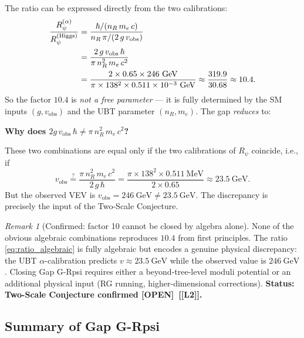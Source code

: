 \documentclass[12pt]{article}
\theoremstyle{definition}
\theoremstyle{remark}
\newtheorem{remark}[theorem]{Remark}
\newcommand{\Ltwo}{\textbf{[L2]}}
\newcommand{\OPEN}{\textbf{[OPEN]}}
\begin{document}
The ratio can be expressed directly from the two calibrations:
\begin{align}
  \frac{R_\psi^{(\alpha)}}{R_\psi^{(\text{Higgs})}}
  &= \frac{\hbar/(n_R\,m_e\,c)}{n_R\,\pi/(2\,g\,v_{\text{obs}})}
  \notag\\
  &= \frac{2\,g\,v_{\text{obs}}\,\hbar}
          {\pi\,n_R^2\,m_e\,c^2}
  \notag\\
  &= \frac{2 \times 0.65 \times 246\ \text{GeV}}
          {\pi \times 138^2 \times 0.511\times10^{-3}\ \text{GeV}}
  \approx \frac{319.9}{30.68}
  \approx 10.4.
  \label{eq:ratio_algebraic}
\end{align}
So the factor $10.4$ is \emph{not a free parameter} — it is fully
determined by the SM inputs $(g, v_{\text{obs}})$ and the UBT
parameter $(n_R, m_e)$.  The gap \emph{reduces} to:

\textbf{Why does $2g\,v_{\text{obs}}\,\hbar \neq \pi\,n_R^2\,m_e\,c^2$?}

These two combinations are equal only if the two calibrations of
$R_\psi$ coincide, i.e., if
\begin{equation}
  v_{\text{obs}} \stackrel{?}{=}
  \frac{\pi\,n_R^2\,m_e\,c^2}{2\,g\,\hbar}
  = \frac{\pi \times 138^2 \times 0.511\ \text{MeV}}{2 \times 0.65}
  \approx 23.5\ \text{GeV}.
\end{equation}
But the observed VEV is $v_{\text{obs}} = 246\ \text{GeV} \neq 23.5\ \text{GeV}$.
The discrepancy is precisely the input of the Two-Scale Conjecture.

\begin{remark}[Confirmed: factor 10 cannot be closed by algebra alone]
None of the obvious algebraic combinations reproduces $10.4$ from
first principles.  The ratio \eqref{eq:ratio_algebraic} is fully
algebraic but encodes a genuine physical discrepancy: the UBT
$\alpha$-calibration predicts $v \approx 23.5\ \text{GeV}$ while
the observed value is $246\ \text{GeV}$.  Closing Gap G-Rpsi requires
either a beyond-tree-level moduli potential or an additional physical
input (RG running, higher-dimensional corrections).
\textbf{Status: Two-Scale Conjecture confirmed \OPEN\ [\Ltwo].}
\end{remark}

\subsection{Summary of Gap G-Rpsi}
\end{document}
